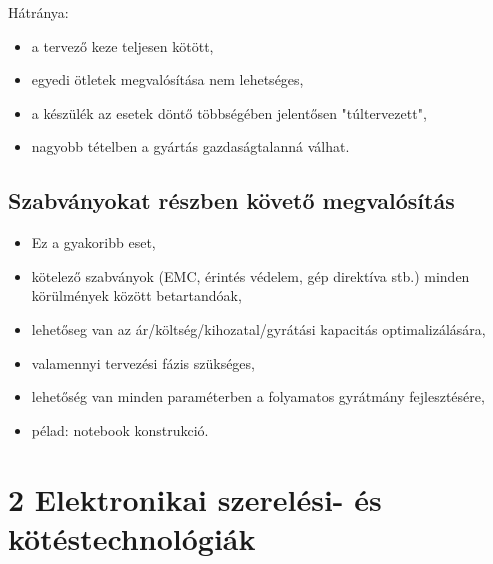 \documentclass[11pt]{article}
\begin{document}
			Hátránya:

			\begin{itemize}
				\item a tervező keze teljesen kötött,
				\item egyedi ötletek megvalósítása nem lehetséges,
				\item a készülék az esetek döntő többségében jelentősen "túltervezett",
				\item nagyobb tételben a gyártás gazdaságtalanná válhat.
			\end{itemize}

		\subsection{Szabványokat részben követő megvalósítás}

			\begin{itemize}
				\item Ez a gyakoribb eset, 
				\item kötelező szabványok (EMC, érintés védelem, gép direktíva stb.) minden körülmények között betartandóak,
				\item lehetőseg van az ár/költség/kihozatal/gyrátási kapacitás optimalizálására,
				\item valamennyi tervezési fázis szükséges,
				\item lehetőség van minden paraméterben a folyamatos gyrátmány fejlesztésére,
				\item pélad: notebook konstrukció.
			\end{itemize}

	\section{2 Elektronikai szerelési- és kötéstechnológiák}

		\subsection{}
\end{document}
